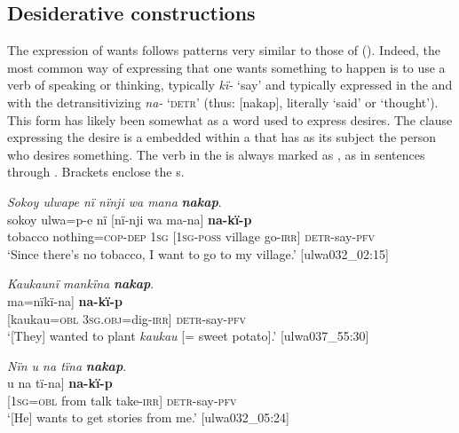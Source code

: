 \subsection{Desiderative constructions}\label{sec:13.9.5}


The expression of wants follows patterns very similar to those of  (). Indeed, the most common way of expressing that one wants something to happen is to use a verb of speaking or thinking, typically \textit{kï-} ‘say’ and typically expressed in the   and with the detransitivizing  \textit{na-} \textsc{‘detr’} (thus: [nakap], literally ‘said’ or ‘thought’). This form has likely been somewhat  as a word used to express desires. The clause expressing the desire is a  embedded within a  that has as its subject the person who desires something. The verb in the  is always marked as , as in sentences  through . Brackets enclose the s.

\ea%
    \label{ex:syntax:379}
          \textit{Sokoy ulwape nï nïnji wa mana} \textbf{\textit{nakap}}.\\
\gll sokoy    ulwa=p-e      nï    [nï-nji    wa    ma-na] \textbf{na-kï-p}\\
    tobacco  nothing=\textsc{cop-dep}  1\textsc{sg}  [1\textsc{sg-poss}  village  go-\textsc{irr]}    \textsc{detr-}say-\textsc{pfv}\\
\glt `Since there’s no tobacco, I want to go to my village.’ [ulwa032\_02:15]
\z

\ea%
    \label{ex:syntax:380}
          \textit{Kaukaunï mankïna} \textbf{\textit{nakap}}.\\
\gll {[kaukau=nï}  {ma=nïkï-na]}    \textbf{na-kï-p}\\
    {[kaukau=\textsc{obl}}  \textsc{3sg.obj=}dig-\textsc{irr]}  \textsc{detr-}say-\textsc{pfv}\\
\glt `[They] wanted to plant \textit{kaukau} [= sweet potato].’ [ulwa037\_55:30]
\z

\ea%
    \label{ex:syntax:381}
          \textit{Nïn u na tïna} \textbf{\textit{nakap}}.\\
\gll {[nï=n}    u    na    {tï-na]}    \textbf{na-kï-p}\\
    {[1\textsc{sg=obl}}  from  talk  take-\textsc{irr]}  \textsc{detr-}say-\textsc{pfv}\\
\glt `[He] wants to get stories from me.’ [ulwa032\_05:24]
\z

